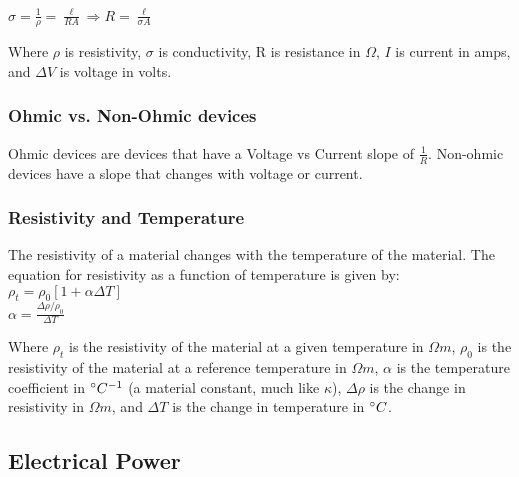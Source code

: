 \vbox{
    \center
    $\sigma = \frac{1}{\rho} = \frac{\ell}{RA} \Longrightarrow R = \frac{\ell}{\sigma A}$
}
\vspace{16pt}

Where $\rho$ is resistivity, $\sigma$ is conductivity, R is resistance in $\Omega$, $I$ is current in amps, and $\Delta V$ is voltage in volts.

\subsubsection*{Ohmic vs. Non-Ohmic devices}
\hspace{.5cm} Ohmic devices are devices that have a Voltage vs Current slope of $\frac{1}{R}$. Non-ohmic devices have a slope that changes with voltage or current.\\

\subsubsection*{Resistivity and Temperature}

\hspace{.5cm} The resistivity of a material changes with the temperature of the material. The equation for resistivity as a function of temperature is given by:\\

\vbox{
    \center
    $\rho_t = \rho_0[1+\alpha\Delta T]$\\
    \vspace{12pt}
    $\alpha = \frac{\Delta \rho/\rho_0}{\Delta T}$
}
\vspace{12pt}

Where $\rho_t$ is the resistivity of the material at a given temperature in $\Omega m$, $\rho_0$ is the resistivity of the material at a reference temperature in $\Omega m$, 
$\alpha$ is the temperature coefficient in $\degree C^{-1}$ (a material constant, much like $\kappa$), $\Delta \rho$ is the change in resistivity in $\Omega m$, 
and $\Delta T$ is the change in temperature in $\degree C$.\\

\vspace{12pt}
\hrulefill

\begin{center}
\subsection*{Electrical Power}
\end{center}

